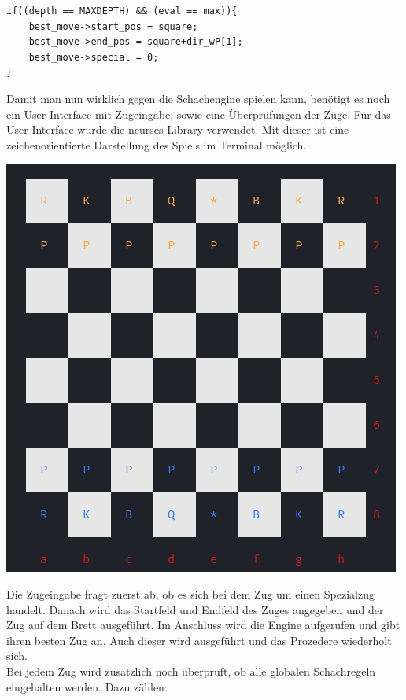 \documentclass[a4paper, 12pt]{article}
\begin{document}
\begin{lstlisting}
if((depth == MAXDEPTH) && (eval == max)){
    best_move->start_pos = square;
    best_move->end_pos = square+dir_wP[1];
    best_move->special = 0;
}
\end{lstlisting}

\pagebreak

Damit man nun wirklich gegen die Schachengine spielen kann, benötigt es noch ein User-Interface mit Zugeingabe, sowie eine Überprüfungen der Züge.
Für das User-Interface wurde die ncurses Library verwendet. Mit dieser ist eine zeichenorientierte Darstellung des Spiels im Terminal möglich.

\begin{center}
\includegraphics[scale=0.7]{images/ncurses_board.png}
\label{ncurses_board}
\end{center}

Die Zugeingabe fragt zuerst ab, ob es sich bei dem Zug um einen Spezialzug handelt. Danach wird das Startfeld und Endfeld des Zuges angegeben und der Zug auf dem Brett ausgeführt. Im Anschluss wird die Engine aufgerufen und gibt ihren besten Zug an. Auch dieser wird ausgeführt und das Prozedere wiederholt sich.\\
Bei jedem Zug wird zusätzlich noch überprüft, ob alle globalen Schachregeln eingehalten werden. Dazu zählen:
\end{document}

